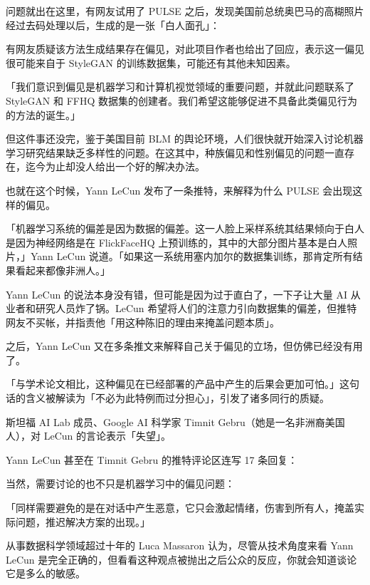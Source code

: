 问题就出在这里，有网友试用了 PULSE 之后，发现美国前总统奥巴马的高糊照片经过去码处理以后，生成的是一张「白人面孔」：




有网友质疑该方法生成结果存在偏见，对此项目作者也给出了回应，表示这一偏见很可能来自于 StyleGAN 的训练数据集，可能还有其他未知因素。

「我们意识到偏见是机器学习和计算机视觉领域的重要问题，并就此问题联系了 StyleGAN 和 FFHQ 数据集的创建者。我们希望这能够促进不具备此类偏见行为的方法的诞生。」

但这件事还没完，鉴于美国目前 BLM 的舆论环境，人们很快就开始深入讨论机器学习研究结果缺乏多样性的问题。在这其中，种族偏见和性别偏见的问题一直存在，迄今为止却没人给出一个好的解决办法。 

也就在这个时候，Yann LeCun 发布了一条推特，来解释为什么 PULSE 会出现这样的偏见。




「机器学习系统的偏差是因为数据的偏差。这一人脸上采样系统其结果倾向于白人是因为神经网络是在 FlickFaceHQ 上预训练的，其中的大部分图片基本是白人照片，」Yann LeCun 说道。「如果这一系统用塞内加尔的数据集训练，那肯定所有结果看起来都像非洲人。」

Yann LeCun 的说法本身没有错，但可能是因为过于直白了，一下子让大量 AI 从业者和研究人员炸了锅。LeCun 希望将人们的注意力引向数据集的偏差，但推特网友不买帐，并指责他「用这种陈旧的理由来掩盖问题本质」。

之后，Yann LeCun 又在多条推文来解释自己关于偏见的立场，但仿佛已经没有用了。




「与学术论文相比，这种偏见在已经部署的产品中产生的后果会更加可怕。」这句话的含义被解读为「不必为此特例而过分担心」，引发了诸多同行的质疑。

斯坦福 AI Lab 成员、Google AI 科学家 Timnit Gebru（她是一名非洲裔美国人），对 LeCun 的言论表示「失望」。

Yann LeCun 甚至在 Timnit Gebru 的推特评论区连写 17 条回复：




当然，需要讨论的也不只是机器学习中的偏见问题：




「同样需要避免的是在对话中产生恶意，它只会激起情绪，伤害到所有人，掩盖实际问题，推迟解决方案的出现。」




从事数据科学领域超过十年的 Luca Massaron 认为，尽管从技术角度来看 Yann LeCun 是完全正确的，但看看这种观点被抛出之后公众的反应，你就会知道谈论它是多么的敏感。


